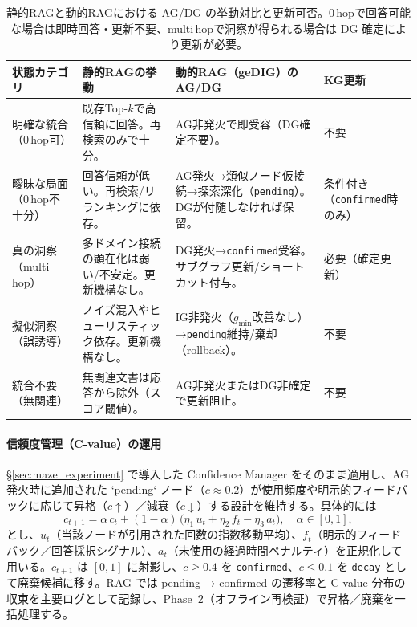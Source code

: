 \documentclass[ja=standard,xelatex]{bxjsarticle}
\begin{document}
\begin{table}[H]
\centering
\renewcommand{\arraystretch}{1.15}
\scriptsize
\begin{tabular}{p{25mm}p{43mm}p{48mm}p{18mm}}
\toprule
状態カテゴリ & 静的RAGの挙動 & 動的RAG（geDIG）のAG/DG & KG更新 \\
\midrule
明確な統合（0\,hop可） & 既存Top-$k$で高信頼に回答。再検索のみで十分。 & AG非発火で即受容（DG確定不要）。 & 不要 \\
曖昧な局面（0\,hop不十分） & 回答信頼が低い。再検索/リランキングに依存。 & AG発火→類似ノード仮接続→探索深化（\texttt{pending}）。DGが付随しなければ保留。 & 条件付き（\texttt{confirmed}時のみ） \\
真の洞察（multi\,hop） & 多ドメイン接続の顕在化は弱い/不安定。更新機構なし。 & DG発火→\texttt{confirmed}受容。サブグラフ更新/ショートカット付与。 & 必要（確定更新） \\
擬似洞察（誤誘導） & ノイズ混入やヒューリスティック依存。更新機構なし。 & IG非発火（$g_{\min}$改善なし）→\texttt{pending}維持/棄却（rollback）。 & 不要 \\
統合不要（無関連） & 無関連文書は応答から除外（スコア閾値）。 & AG非発火またはDG非確定で更新阻止。 & 不要 \\
\bottomrule
\end{tabular}
\caption{静的RAGと動的RAGにおける AG/DG の挙動対比と更新可否。0\,hopで回答可能な場合は即時回答・更新不要、multi\,hopで洞察が得られる場合は DG 確定により更新が必要。}
\label{tab:rag_static_dynamic_flow}
\end{table}
\renewcommand{\arraystretch}{1.0}

\paragraph{信頼度管理（C-value）の運用}
\S\ref{sec:maze_experiment} で導入した Confidence Manager をそのまま適用し、AG発火時に追加された `pending` ノード（$c\approx0.2$）が使用頻度や明示的フィードバックに応じて昇格（$c \uparrow$）／減衰（$c \downarrow$）する設計を維持する。具体的には
\begin{equation}
  c_{t+1} = \alpha\,c_t + (1-\alpha)\,\bigl(\eta_1\,u_t + \eta_2\,f_t - \eta_3\,a_t\bigr),\quad \alpha\in[0,1],
  \label{eq:cvalue_update}
\end{equation}
とし、$u_t$（当該ノードが引用された回数の指数移動平均）、$f_t$（明示的フィードバック／回答採択シグナル）、$a_t$（未使用の経過時間ペナルティ）を正規化して用いる。$c_{t+1}$ は $[0,1]$ に射影し、$c\ge 0.4$ を \texttt{confirmed}、$c\le 0.1$ を \texttt{decay} として廃棄候補に移す。RAG では pending → confirmed の遷移率と C-value 分布の収束を主要ログとして記録し、Phase~2（オフライン再検証）で昇格／廃棄を一括処理する。
\end{document}
